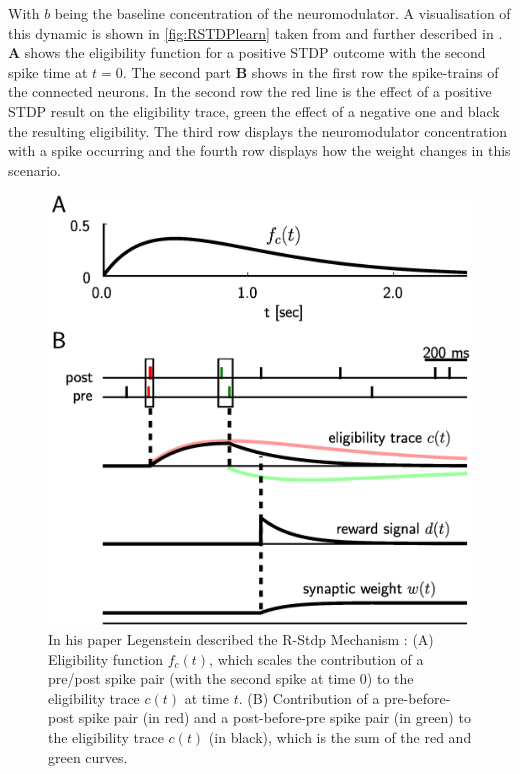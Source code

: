 With $b$ being the baseline concentration of the neuromodulator. A visualisation of this dynamic is shown in \autoref{fig:RSTDPlearn} taken from and further described in \cite{legenstein2008learning}.  \textbf{A} shows the eligibility function for a positive STDP outcome with the second spike time at $t = 0$. The second part \textbf{B} shows in the first row the spike-trains of the connected neurons. In the second row the red line is the effect of a positive STDP result on the eligibility trace, green the effect of a negative one and black the resulting eligibility. The third row displays the neuromodulator concentration with a spike occurring and the fourth row displays how the weight changes in this scenario.


\begin{figure}[htpb]
  \centering
  \includegraphics[scale=3]{figures/rstdp.png}
  \caption[R-STDP meachanic]{In his paper Legenstein described the R-Stdp Mechanism
  \cite{legenstein2008learning}:\newline
  (A) Eligibility function $f_c(t)$, which scales the contribution of a pre/post spike pair (with the second spike at time 0) to the eligibility trace $c(t)$ at time $t$. (B) Contribution of a pre-before-post spike pair (in red) and a post-before-pre spike pair (in green) to the eligibility trace $c(t)$ (in black), which is the sum of the red and green curves.}
  \label{fig:RSTDPlearn}
\end{figure}

